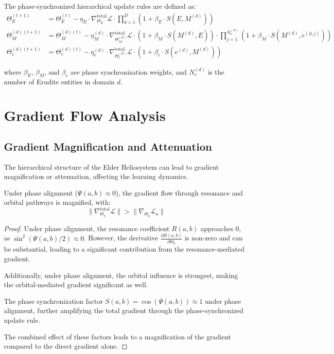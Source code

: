 \begin{definition}
The phase-synchronized hierarchical update rules are defined as:
\begin{align}
\Theta_E^{(t+1)} &= \Theta_E^{(t)} - \eta_E \cdot \nabla_{\Theta_E}^{\text{total}} \mathcal{L} \cdot \prod_{d=1}^D \left(1 + \beta_E \cdot S(E, M^{(d)})\right) \\
\Theta_M^{(d)(t+1)} &= \Theta_M^{(d)(t)} - \eta_M^{(d)} \cdot \nabla_{\Theta_M^{(d)}}^{\text{total}} \mathcal{L} \cdot \left(1 + \beta_M \cdot S(M^{(d)}, E)\right) \cdot \prod_{j=1}^{N_e^{(d)}} \left(1 + \beta_M \cdot S(M^{(d)}, e^{(d,j)})\right) \\
\Theta_e^{(d)(t+1)} &= \Theta_e^{(d)(t)} - \eta_e^{(d)} \cdot \nabla_{\Theta_e^{(d)}}^{\text{total}} \mathcal{L} \cdot \left(1 + \beta_e \cdot S(e^{(d)}, M^{(d)})\right)
\end{align}

where $\beta_E$, $\beta_M$, and $\beta_e$ are phase synchronization weights, and $N_e^{(d)}$ is the number of Erudite entities in domain $d$.
\end{definition}

\section{Gradient Flow Analysis}

\subsection{Gradient Magnification and Attenuation}

The hierarchical structure of the Elder Heliosystem can lead to gradient magnification or attenuation, affecting the learning dynamics.

\begin{theorem}
Under phase alignment ($\Psi(a, b) \approx 0$), the gradient flow through resonance and orbital pathways is magnified, with:
\begin{equation}
\|\nabla_{\Theta_a}^{\text{total}} \mathcal{L}\| > \|\nabla_{\Theta_a} \mathcal{L}_a\|
\end{equation}
\end{theorem}

\begin{proof}
Under phase alignment, the resonance coefficient $R(a, b)$ approaches 0, as $\sin^2(\Psi(a, b)/2) \approx 0$. However, the derivative $\frac{\partial R(a, b)}{\partial \Theta_a}$ is non-zero and can be substantial, leading to a significant contribution from the resonance-mediated gradient.

Additionally, under phase alignment, the orbital influence is strongest, making the orbital-mediated gradient significant as well.

The phase synchronization factor $S(a, b) = \cos(\Psi(a, b)) \approx 1$ under phase alignment, further amplifying the total gradient through the phase-synchronized update rule.

The combined effect of these factors leads to a magnification of the gradient compared to the direct gradient alone.
\end{proof}

